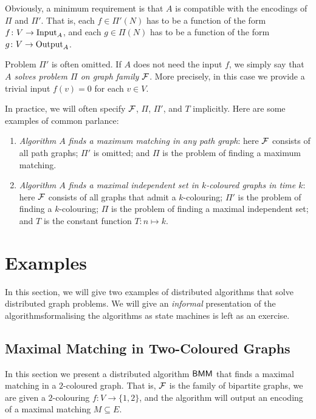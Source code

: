 Obviously, a minimum requirement is that $A$ is compatible with the encodings of $\Pi$ and $\Pi'$. That is, each $f \in \Pi'(N)$ has to be a function of the form $f\colon V \to \operatorname{Input}_A$, and each $g \in \Pi(N)$ has to be a function of the form $g\colon V \to \operatorname{Output}_A$.

Problem $\Pi'$ is often omitted. If $A$ does not need the input $f$, we simply say that \emph{$A$ solves problem $\Pi$ on graph family $\mathcal{F}$}. More precisely, in this case we provide a trivial input $f(v) = 0$ for each $v \in V$.

In practice, we will often specify $\mathcal{F}$, $\Pi$, $\Pi'$, and $T$ implicitly. Here are some examples of common parlance:
\begin{enumerate}
    \item \emph{Algorithm $A$ finds a maximum matching in any path graph}: here $\mathcal{F}$ consists of all path graphs; $\Pi'$ is omitted; and $\Pi$ is the problem of finding a maximum matching.
    \item \emph{Algorithm $A$ finds a maximal independent set in $k$-coloured graphs in time $k$}: here $\mathcal{F}$ consists of all graphs that admit a $k$-colouring; $\Pi'$ is the problem of finding a $k$-colouring; $\Pi$ is the problem of finding a maximal independent set; and $T$ is the constant function $T\colon n \mapsto k$.
\end{enumerate}


\section{Examples}\label{sec:pn-examples}

In this section, we will give two examples of distributed algorithms that solve distributed graph problems. We will give an \emph{informal} presentation of the algorithms\mydash formalising the algorithms as state machines is left as an exercise.

\subsection{Maximal Matching in Two-Coloured Graphs}\label{ssec:bmm}

In this section we present a distributed algorithm $\textsf{BMM}$ that finds a maximal matching in a $2$-coloured graph. That is, $\mathcal{F}$ is the family of bipartite graphs, we are given a $2$-colouring $f\colon V \to \{1,2\}$, and the algorithm will output an encoding of a maximal matching $M \subseteq E$.

